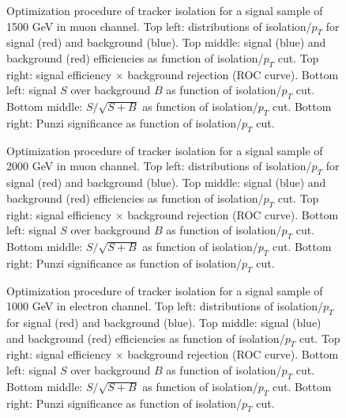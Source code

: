 \documentclass[12pt]{article} %
\begin{document}
\begin{figure}[H] %
  \caption{Optimization procedure of tracker isolation for a signal sample of 1500 GeV in muon channel. Top left: distributions of isolation/$p_T$ for signal (red) and background (blue). Top middle: signal (blue) and background (red) efficiencies as function of isolation/$p_T$ cut. Top right: signal efficiency $\times$ background rejection (ROC curve). Bottom left: signal $S$ over background $B$ as function of isolation/$p_T$ cut. Bottom middle: $S/\sqrt{S + B}$ as function of isolation/$p_T$ cut. Bottom right: Punzi significance as function of isolation/$p_T$ cut.}
  \label{fig:mu1500}
\end{figure}

\begin{figure}[H] %
  \caption{Optimization procedure of tracker isolation for a signal sample of 2000 GeV in muon channel. Top left: distributions of isolation/$p_T$ for signal (red) and background (blue). Top middle: signal (blue) and background (red) efficiencies as function of isolation/$p_T$ cut. Top right: signal efficiency $\times$ background rejection (ROC curve). Bottom left: signal $S$ over background $B$ as function of isolation/$p_T$ cut. Bottom middle: $S/\sqrt{S + B}$ as function of isolation/$p_T$ cut. Bottom right: Punzi significance as function of isolation/$p_T$ cut.}
  \label{fig:mu2000}
\end{figure}


\begin{figure}[H] %
  \caption{Optimization procedure of tracker isolation for a signal sample of 1000 GeV in electron channel. Top left: distributions of isolation/$p_T$ for signal (red) and background (blue). Top middle: signal (blue) and background (red) efficiencies as function of isolation/$p_T$ cut. Top right: signal efficiency $\times$ background rejection (ROC curve). Bottom left: signal $S$ over background $B$ as function of isolation/$p_T$ cut. Bottom middle: $S/\sqrt{S + B}$ as function of isolation/$p_T$ cut. Bottom right: Punzi significance as function of isolation/$p_T$ cut.}
  \label{fig:eletrk1000}
\end{figure}
\end{document}
